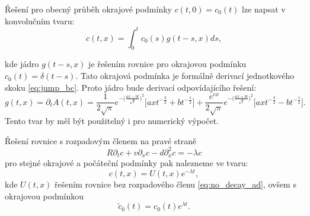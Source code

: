 \documentclass{article}
\def\prtl{\partial}
\begin{document}
Řešení pro obecný průběh okrajové podmínky $c(t,0) = c_0(t)$ lze napsat v konvolučním tvaru:
\[
    c(t,x) = \int_0^t c_0(s) g(t - s, x) ds,
\]

kde jádro $g(t - s, x)$ je řešením rovnice pro okrajovou podmínku $c_0(t) = \delta(t - s)$. 
Tato okrajová podmínka je formálně derivací jednotkového skoku \eqref{eq:jump_bc}. 
Proto jádro bude derivací odpovídajícího řešení:
\[
    g(t, x) = \prtl_t A(t, x) = 
    \frac{1}{2\sqrt{\pi}} 
    e^{-\big( \frac{ax-bt}{\sqrt{t}}\big)^2}
    \Big[ ax t^{-\frac32} + b t^{-\frac12}\Big]
    + \frac{e^{cx}}{2\sqrt{\pi}}  
    e^{-\big( \frac{ax+bt}{\sqrt{t}}\big)^2}
    \Big[ ax t^{-\frac32} - b t^{-\frac12}\Big].
\]
Tento tvar by měl být použitelný i pro numerický výpočet.


Řešení rovnice s rozpadovým členem na pravé straně
\[
 R\prtl_t c + v \prtl_x c - d \prtl^2_x c = - \lambda c
\]
pro stejné okrajové a počáteční podmínky pak nalezneme ve tvaru:
\[
    c(t,x) = U(t,x) e^{-\lambda t},
\]
kde $U(t,x)$ řešením rovnice bez rozpadového členu \eqref{eq:no_decay_ad}, ovšem s okrajovou podmínkou
\[
    \tilde{c}_0(t) = c_0(t) e^{\lambda t}.
\]






\end{document}
